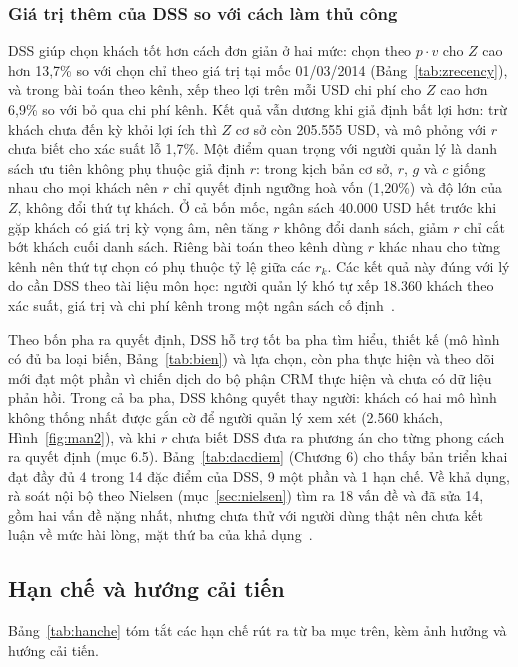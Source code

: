 \subsubsection{Giá trị thêm của DSS so với cách làm thủ công}
DSS giúp chọn khách tốt hơn cách đơn giản ở hai mức: chọn theo $p \cdot v$ cho $Z$ cao hơn 13,7\% so với chọn chỉ theo giá trị tại mốc 01/03/2014 (Bảng~\ref{tab:zrecency}), và trong bài toán theo kênh, xếp theo lợi trên mỗi USD chi phí cho $Z$ cao hơn 6,9\% so với bỏ qua chi phí kênh. Kết quả vẫn dương khi giả định bất lợi hơn: trừ khách chưa đến kỳ khỏi lợi ích thì $Z$ cơ sở còn 205.555 USD, và mô phỏng với $r$ chưa biết cho xác suất lỗ 1,7\%. Một điểm quan trọng với người quản lý là danh sách ưu tiên không phụ thuộc giả định $r$: trong kịch bản cơ sở, $r$, $g$ và $c$ giống nhau cho mọi khách nên $r$ chỉ quyết định ngưỡng hoà vốn (1,20\%) và độ lớn của $Z$, không đổi thứ tự khách. Ở cả bốn mốc, ngân sách 40.000 USD hết trước khi gặp khách có giá trị kỳ vọng âm, nên tăng $r$ không đổi danh sách, giảm $r$ chỉ cắt bớt khách cuối danh sách. Riêng bài toán theo kênh dùng $r$ khác nhau cho từng kênh nên thứ tự chọn có phụ thuộc tỷ lệ giữa các $r_k$. Các kết quả này đúng với lý do cần DSS theo tài liệu môn học: người quản lý khó tự xếp 18.360 khách theo xác suất, giá trị và chi phí kênh trong một ngân sách cố định~\cite{tlmh}.

Theo bốn pha ra quyết định, DSS hỗ trợ tốt ba pha tìm hiểu, thiết kế (mô hình có đủ ba loại biến, Bảng~\ref{tab:bien}) và lựa chọn, còn pha thực hiện và theo dõi mới đạt một phần vì chiến dịch do bộ phận CRM thực hiện và chưa có dữ liệu phản hồi. Trong cả ba pha, DSS không quyết thay người: khách có hai mô hình không thống nhất được gắn cờ để người quản lý xem xét (2.560 khách, Hình~\ref{fig:man2}), và khi $r$ chưa biết DSS đưa ra phương án cho từng phong cách ra quyết định (mục 6.5). Bảng~\ref{tab:dacdiem} (Chương 6) cho thấy bản triển khai đạt đầy đủ 4 trong 14 đặc điểm của DSS, 9 một phần và 1 hạn chế. Về khả dụng, rà soát nội bộ theo Nielsen (mục~\ref{sec:nielsen}) tìm ra 18 vấn đề và đã sửa 14, gồm hai vấn đề nặng nhất, nhưng chưa thử với người dùng thật nên chưa kết luận về mức hài lòng, mặt thứ ba của khả dụng~\cite{iso9241}.

\subsection{Hạn chế và hướng cải tiến}\label{sec:hanche}
Bảng~\ref{tab:hanche} tóm tắt các hạn chế rút ra từ ba mục trên, kèm ảnh hưởng và hướng cải tiến.

